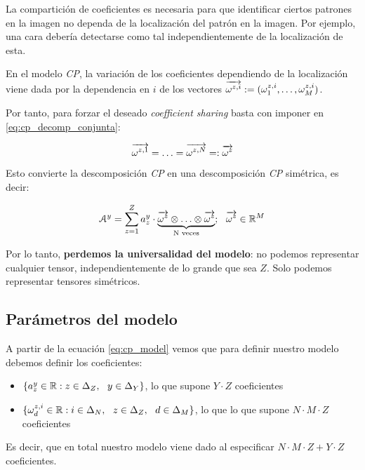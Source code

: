 La compartición de coeficientes es necesaria para que identificar ciertos patrones en la imagen no dependa de la localización del patrón en la imagen. Por ejemplo, una cara debería detectarse como tal independientemente de la localización de esta.

En el modelo \textit{CP}, la variación de los coeficientes dependiendo de la localización viene dada por la dependencia en $i$ de los vectores $\overrightarrow{\omega^{z,i}} := (\omega^{z, i}_1, \ldots, \omega^{z, i}_M)$.

Por tanto, para forzar el deseado \textit{coefficient sharing} basta con imponer en \eqref{eq:cp_decomp_conjunta}:

\begin{equation}
    \overrightarrow{\omega^{z, 1}} = \ldots = \overrightarrow{\omega^{z, N}} =: \overrightarrow{\omega^z}
\end{equation}

Esto convierte la descomposición \textit{CP} en una descomposición \textit{CP} simétrica, es decir:

\begin{equation}
    \mathcal{A}^y = \sum_{z = 1}^Z a_z^y \cdot \underbrace{\overrightarrow{\omega^z} \otimes \ldots \otimes \overrightarrow{\omega^z}}_\textrm{N veces}; \ \  \overrightarrow{\omega^z} \in \mathbb{R}^M
\end{equation}

Por lo tanto, \textbf{perdemos la universalidad del modelo}: no podemos representar cualquier tensor, independientemente de lo grande que sea $Z$. Solo podemos representar tensores simétricos.

\subsection{Parámetros del modelo} \label{msubsec:parametros_modelo_cp}

A partir de la ecuación \eqref{eq:cp_model} vemos que para definir nuestro modelo debemos definir los coeficientes:

\begin{itemize}
    \item $\{a_z^y \in \mathbb{R} : z \in \Delta_{Z}, \ \  y \in \Delta_{Y}\}$, lo que supone $Y \cdot Z$ coeficientes
    \item $\{\omega_d^{z, i} \in \mathbb{R}: i \in \Delta_{N}, \ \  z \in \Delta_{Z}, \ \  d \in \Delta_{M}\}$, lo que lo que supone $N \cdot M \cdot Z$ coeficientes
\end{itemize}

Es decir, que en total nuestro modelo viene dado al especificar $N \cdot M \cdot Z + Y \cdot Z$ coeficientes.

